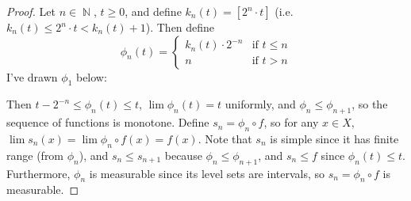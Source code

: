 \documentclass[12pt, a4paper]{book}
\DeclareMathOperator{\N}{\mathbb{N}}
\theoremstyle{nonumberplain}
\newtheorem{proof}{Proof}
\begin{document}
\begin{proof}
    Let $n\in\N$, $t\geq0$, and define $k_n(t)=[2^{n}\cdot t]$ (i.e. $k_n(t)\leq 2^{n}\cdot t<k_n(t)+1$).
    Then define
    \[\phi_n(t)=\begin{cases}k_n(t)\cdot 2^{-n}&\text{if }t\leq n\\n&\text{if }t>n\end{cases}\]
    I've drawn $\phi_1$ below:
    \begin{center}
    \end{center}
    Then $t-2^{-n}\leq\phi_n(t)\leq t$, $\lim\phi_n(t)=t$ uniformly, and $\phi_n\leq \phi_{n+1}$, so the sequence of functions is monotone.
    Define $s_n=\phi_n\circ f$, so for any $x\in X$, $\lim s_n(x)=\lim \phi_n\circ f(x)=f(x)$.
    Note that $s_n$ is simple since it has finite range (from $\phi_n$), and $s_n\leq s_{n+1}$ because $\phi_n\leq \phi_{n+1}$, and $s_n\leq f$ since $\phi_n(t)\leq t$.
    Furthermore, $\phi_n$ is measurable since its level sets are intervals, so $s_n=\phi_n\circ f$ is measurable.
\end{proof}
\end{document}
